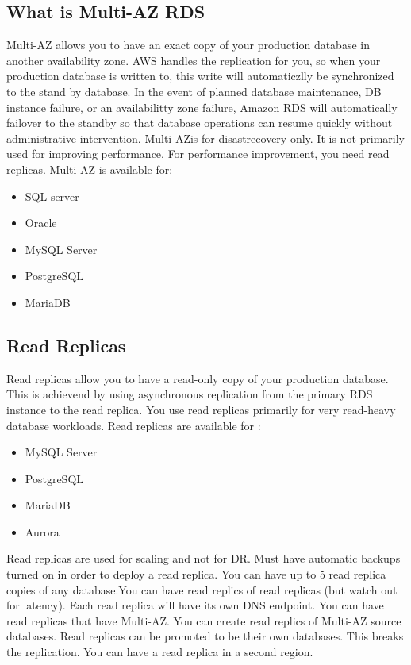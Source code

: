 \documentclass{article}
\begin{document}
\subsection{What is Multi-AZ RDS}
Multi-AZ allows you to have an exact copy of your production database in another availability zone. AWS handles the replication for you, so when your production database is written to, this write will automaticzlly be synchronized to the stand by database. In the event of planned database maintenance, DB instance failure, or an availabilitty zone failure, Amazon RDS will automatically failover to the standby so that database operations can resume quickly without administrative intervention. Multi-AZis for disastrecovery only. It is not primarily used for improving performance, For performance improvement, you need read replicas. Multi AZ is available for:
\begin{itemize}
\item
SQL server

\item
Oracle

\item
MySQL Server

\item
PostgreSQL

\item
MariaDB

\end{itemize}

\subsection{Read Replicas}
Read replicas allow you to have a read-only copy of your production database. This is achievend by using asynchronous replication from the primary RDS instance to the read replica. You use read replicas primarily for very read-heavy database workloads. Read replicas are available for :

\begin{itemize}
\item
MySQL Server

\item
PostgreSQL

\item
MariaDB

\item
Aurora
\end{itemize}

Read replicas are used for scaling and not for DR. Must have automatic backups turned on in order to deploy a read replica. You can have up to 5 read replica copies of any database.You can have read replics of read replicas (but watch out for latency). Each read replica will have its own DNS endpoint. You can have read replicas that have Multi-AZ. You can create read replics of Multi-AZ source databases. Read replicas can be promoted to be their own databases. This breaks the replication. You can have a read replica in a second region.
\end{document}
